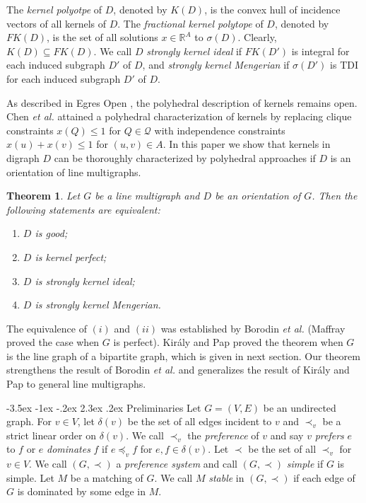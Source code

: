 \documentclass[11pt]{article}
\makeatletter
\newtheorem{theorem}{Theorem}%
\numberwithin{theorem}{section}
\renewcommand\section{%
  \@startsection{section}{1}
                {\z@}%
                {-3.5ex \@plus -1ex \@minus -.2ex}%
                {2.3ex \@plus.2ex}%
                {\large\bfseries}%
}
\makeatother
\begin{document}
The \textit{kernel polyotpe} of $D$, denoted by $K(D)$, is the convex hull of incidence vectors of all kernels of $D$.  The \textit{fractional kernel polytope} of $D$, denoted by $FK(D)$, is the set of all solutions $x\in \mathbb{R}^A$ to $\sigma(D)$. Clearly, $K(D)\subseteq FK(D)$.
We call $D$ \textit{strongly kernel ideal} if $FK(D')$ is integral for each induced subgraph $D'$ of $D$, and \textit{strongly kernel Mengerian} if $\sigma(D')$ is TDI for each induced subgraph $D'$ of $D$.

As described in Egres Open \cite{Egres}, the polyhedral description of kernels remains open. Chen \textit{et al.} \cite{ChenChen16} attained a polyhedral characterization of kernels by replacing clique constraints $x(Q)\leq 1$ for $Q\in\mathcal{Q}$ with independence constraints $x(u)+x(v)\leq 1$ for $(u,v)\in A$. In this paper we show that kernels in digraph $D$ can be thoroughly characterized by polyhedral approaches if $D$ is an orientation of line multigraphs.

\begin{theorem}
\label{thm:main}
Let $G$ be a line multigraph and $D$ be an orientation of $G$. Then the following statements are equivalent:
\begin{enumerate}[label={\emph{(}\roman*\emph{)}}]
	\item $D$ is good;
	\item $D$ is kernel perfect;
	\item $D$ is strongly kernel ideal;
	\item $D$ is strongly kernel Mengerian.
\end{enumerate}
\end{theorem}

The equivalence of $(i)$ and $(ii)$ was established by Borodin \textit{et al.} \cite{BoroKost98} (Maffray \cite{Maff92} proved the case when $G$ is perfect). Kir\'{a}ly and Pap \cite{KiraPap08} proved the theorem when $G$ is the line graph of a bipartite graph, which is given in next section.
Our theorem strengthens the result of Borodin \textit{et al.} and generalizes the result of Kir\'{a}ly and Pap to general line multigraphs.


\section{Preliminaries}
\label{pre}
Let $G=(V,E)$ be an undirected graph. For $v\in V$, let $\delta(v)$ be the set of all edges incident to $v$ and $\prec_v$ be a strict linear order on $\delta(v)$. We call $\prec_v$ the \emph{preference} of $v$ and say $v$ \emph{prefers} $e$ to $f$ or $e$ \emph{dominates} $f$ if $e\preceq_v f$ for $e,f\in \delta(v)$. Let $\prec$ be the set of all  $\prec_v$ for $v\in V$. We call $(G,\prec)$ a \emph{preference system} and call $(G,\prec)$ \emph{simple} if $G$ is simple. Let $M$ be a matching of $G$. We call $M$ \emph{stable} in $(G,\prec)$ if each edge of $G$ is dominated by some edge in $M$.
\end{document}
